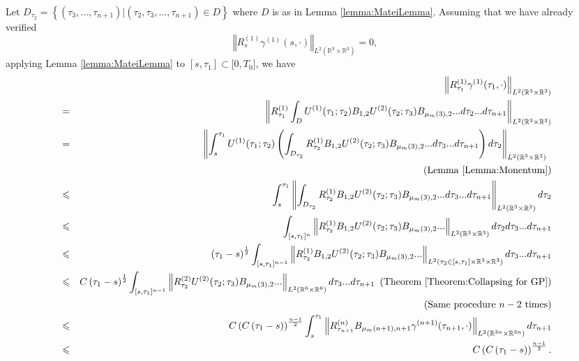 \documentclass[reqno]{amsart}
\theoremstyle{plain}
\numberwithin{equation}{section}
\begin{document}
Let $D_{\tau _{2}}=\left\{ \left( \tau _{3},...,\tau _{n+1}\right) |\left(
\tau _{2},\tau _{3},...,\tau _{n+1}\right) \in D\right\} $ where $D$ is as
in Lemma \ref{lemma:MateiLemma}. Assuming that we have already verified 
\begin{equation*}
\left\Vert R_{s}^{(1)}\gamma ^{(1)}(s,\cdot )\right\Vert _{L^{2}(\mathbb{R}^{3}\times \mathbb{R}^{3})}=0,
\end{equation*}applying Lemma \ref{lemma:MateiLemma} to $[s,\tau _{1}]\subset \lbrack
0,T_{0}]$, we have\begin{eqnarray*}
&&\left\Vert R_{\tau _{1}}^{(1)}\gamma ^{(1)}(\tau _{1},\cdot )\right\Vert
_{L^{2}(\mathbb{R}^{3}\times \mathbb{R}^{3})} \\
&=&\left\Vert R_{\tau _{1}}^{(1)}\int_{D}U^{(1)}(\tau _{1};\tau
_{2})B_{1,2}U^{(2)}(\tau _{2};\tau _{3})B_{\mu _{m}(3),2}...d\tau
_{2}...d\tau _{n+1}\right\Vert _{L^{2}(\mathbb{R}^{3}\times \mathbb{R}^{3})}
\\
&=&\left\Vert \int_{s}^{\tau _{1}}U^{(1)}(\tau _{1};\tau _{2})\left(
\int_{D_{\tau _{2}}}R_{\tau _{2}}^{(1)}B_{1,2}U^{(2)}(\tau _{2};\tau
_{3})B_{\mu _{m}(3),2}...d\tau _{3}...d\tau _{n+1}\right) d\tau
_{2}\right\Vert _{L^{2}(\mathbb{R}^{3}\times \mathbb{R}^{3})}\text{ } \\
&&\text{(Lemma \ref{Lemma:Monentum})} \\
&\leqslant &\int_{s}^{\tau _{1}}\left\Vert \int_{D_{\tau _{2}}}R_{\tau
_{2}}^{(1)}B_{1,2}U^{(2)}(\tau _{2};\tau _{3})B_{\mu _{m}(3),2}...d\tau
_{3}...d\tau _{n+1}\right\Vert _{L^{2}(\mathbb{R}^{3}\times \mathbb{R}^{3})}d\tau _{2} \\
&\leqslant &\int_{[s,\tau _{1}]^{n}}\left\Vert R_{\tau
_{2}}^{(1)}B_{1,2}U^{(2)}(\tau _{2};\tau _{3})B_{\mu
_{m}(3),2}...\right\Vert _{L^{2}(\mathbb{R}^{3}\times \mathbb{R}^{3})}d\tau
_{2}d\tau _{3}...d\tau _{n+1} \\
&\leqslant &\left( \tau _{1}-s\right) ^{\frac{1}{2}}\int_{[s,\tau
_{1}]^{n-1}}\left\Vert R_{\tau _{2}}^{(1)}B_{1,2}U^{(2)}(\tau _{2};\tau
_{3})B_{\mu _{m}(3),2}...\right\Vert _{L^{2}(\tau _{2}\in \lbrack s,\tau
_{1}]\times \mathbb{R}^{3}\times \mathbb{R}^{3})}d\tau _{3}...d\tau _{n+1} \\
&\leqslant &C\left( \tau _{1}-s\right) ^{\frac{1}{2}}\int_{[s,\tau
_{1}]^{n-1}}\left\Vert R_{\tau _{2}}^{(2)}U^{(2)}(\tau _{2};\tau _{3})B_{\mu
_{m}(3),2}...\right\Vert _{L^{2}(\mathbb{R}^{6}\times \mathbb{R}^{6})}d\tau
_{3}...d\tau _{n+1}\text{ }\left( \text{Theorem \ref{Theorem:Collapsing for
GP}}\right) \\
&&(\text{Same procedure }n-2\text{ times}) \\
&\leqslant &C\left( C\left( \tau _{1}-s\right) \right) ^{\frac{n-1}{2}}\int_{s}^{\tau _{1}}\left\Vert R_{\tau _{n+1}}^{(n)}B_{\mu
_{m}(n+1),n+1}\gamma ^{(n+1)}(\tau _{n+1},\cdot )\right\Vert _{L^{2}(\mathbb{R}^{3n}\times \mathbb{R}^{3n})}d\tau _{n+1} \\
&\leqslant &C\left( C\left( \tau _{1}-s\right) \right) ^{\frac{n-1}{2}}.
\end{eqnarray*}
\end{document}
